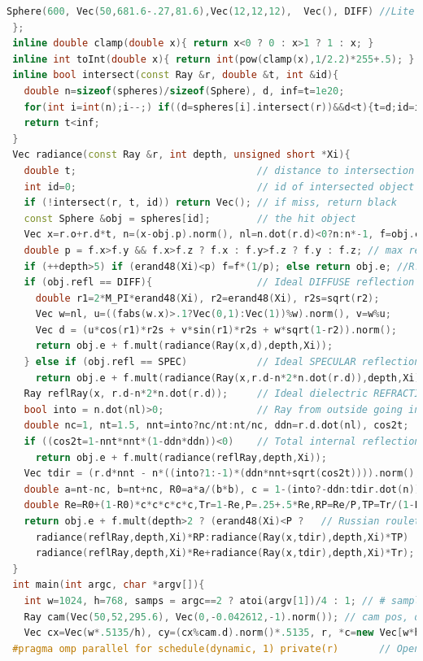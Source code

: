\begin{lstlisting}[language=C++]
   Sphere(600, Vec(50,681.6-.27,81.6),Vec(12,12,12),  Vec(), DIFF) //Lite 
 }; 
 inline double clamp(double x){ return x<0 ? 0 : x>1 ? 1 : x; } 
 inline int toInt(double x){ return int(pow(clamp(x),1/2.2)*255+.5); } 
 inline bool intersect(const Ray &r, double &t, int &id){ 
   double n=sizeof(spheres)/sizeof(Sphere), d, inf=t=1e20; 
   for(int i=int(n);i--;) if((d=spheres[i].intersect(r))&&d<t){t=d;id=i;} 
   return t<inf; 
 } 
 Vec radiance(const Ray &r, int depth, unsigned short *Xi){ 
   double t;                               // distance to intersection 
   int id=0;                               // id of intersected object 
   if (!intersect(r, t, id)) return Vec(); // if miss, return black 
   const Sphere &obj = spheres[id];        // the hit object 
   Vec x=r.o+r.d*t, n=(x-obj.p).norm(), nl=n.dot(r.d)<0?n:n*-1, f=obj.c; 
   double p = f.x>f.y && f.x>f.z ? f.x : f.y>f.z ? f.y : f.z; // max refl 
   if (++depth>5) if (erand48(Xi)<p) f=f*(1/p); else return obj.e; //R.R. 
   if (obj.refl == DIFF){                  // Ideal DIFFUSE reflection 
     double r1=2*M_PI*erand48(Xi), r2=erand48(Xi), r2s=sqrt(r2); 
     Vec w=nl, u=((fabs(w.x)>.1?Vec(0,1):Vec(1))%w).norm(), v=w%u; 
     Vec d = (u*cos(r1)*r2s + v*sin(r1)*r2s + w*sqrt(1-r2)).norm(); 
     return obj.e + f.mult(radiance(Ray(x,d),depth,Xi)); 
   } else if (obj.refl == SPEC)            // Ideal SPECULAR reflection 
     return obj.e + f.mult(radiance(Ray(x,r.d-n*2*n.dot(r.d)),depth,Xi)); 
   Ray reflRay(x, r.d-n*2*n.dot(r.d));     // Ideal dielectric REFRACTION 
   bool into = n.dot(nl)>0;                // Ray from outside going in? 
   double nc=1, nt=1.5, nnt=into?nc/nt:nt/nc, ddn=r.d.dot(nl), cos2t; 
   if ((cos2t=1-nnt*nnt*(1-ddn*ddn))<0)    // Total internal reflection 
     return obj.e + f.mult(radiance(reflRay,depth,Xi)); 
   Vec tdir = (r.d*nnt - n*((into?1:-1)*(ddn*nnt+sqrt(cos2t)))).norm(); 
   double a=nt-nc, b=nt+nc, R0=a*a/(b*b), c = 1-(into?-ddn:tdir.dot(n)); 
   double Re=R0+(1-R0)*c*c*c*c*c,Tr=1-Re,P=.25+.5*Re,RP=Re/P,TP=Tr/(1-P); 
   return obj.e + f.mult(depth>2 ? (erand48(Xi)<P ?   // Russian roulette 
     radiance(reflRay,depth,Xi)*RP:radiance(Ray(x,tdir),depth,Xi)*TP) : 
     radiance(reflRay,depth,Xi)*Re+radiance(Ray(x,tdir),depth,Xi)*Tr); 
 } 
 int main(int argc, char *argv[]){ 
   int w=1024, h=768, samps = argc==2 ? atoi(argv[1])/4 : 1; // # samples 
   Ray cam(Vec(50,52,295.6), Vec(0,-0.042612,-1).norm()); // cam pos, dir 
   Vec cx=Vec(w*.5135/h), cy=(cx%cam.d).norm()*.5135, r, *c=new Vec[w*h]; 
 #pragma omp parallel for schedule(dynamic, 1) private(r)       // OpenMP 

\end{lstlisting}
